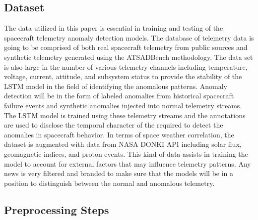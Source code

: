 \documentclass[conference]{IEEEtran}
\begin{document}
\subsection{Dataset}

The data utilized in this paper is essential in training and testing of the spacecraft telemetry anomaly detection models. The database of telemetry data is going to be comprised of both real spacecraft telemetry from public sources and synthetic telemetry generated using the ATSADBench methodology. The data set is also large in the number of various telemetry channels including temperature, voltage, current, attitude, and subsystem status to provide the stability of the LSTM model in the field of identifying the anomalous patterns. Anomaly detection will be in the form of labeled anomalies from historical spacecraft failure events and synthetic anomalies injected into normal telemetry streams. The LSTM model is trained using these telemetry streams and the annotations are used to disclose the temporal character of the required to detect the anomalies in spacecraft behavior. In terms of space weather correlation, the dataset is augmented with data from NASA DONKI API including solar flux, geomagnetic indices, and proton events. This kind of data assists in training the model to account for external factors that may influence telemetry patterns. Any news is very filtered and branded to make sure that the models will be in a position to distinguish between the normal and anomalous telemetry.

\subsection{Preprocessing Steps}
\end{document}
